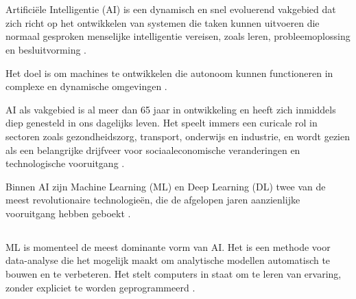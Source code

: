\chapter{}%
\label{ch:stand-van-zaken}



\section{}%
\label{sec:artificiële-intelligentie}

Artificiële Intelligentie (AI) is een dynamisch en snel evoluerend vakgebied dat zich richt op het ontwikkelen van systemen die taken kunnen uitvoeren die normaal gesproken menselijke intelligentie vereisen, zoals leren, probleemoplossing en besluitvorming \autocite{SharifaniEtAl2023}.

Het doel is om machines te ontwikkelen die autonoom kunnen functioneren in complexe en dynamische omgevingen \autocite{Kouassi2023}.

AI als vakgebied is al meer dan 65 jaar in ontwikkeling en heeft zich inmiddels diep genesteld in ons dagelijks leven. Het speelt immers een curicale rol in sectoren zoals gezondheidszorg, transport, onderwijs en industrie, en wordt gezien als een belangrijke drijfveer voor sociaaleconomische veranderingen en technologische vooruitgang \autocite{JiangEtAl2022}.

Binnen AI zijn Machine Learning (ML) en Deep Learning (DL) twee van de meest revolutionaire technologieën, die de afgelopen jaren aanzienlijke vooruitgang hebben geboekt \autocite{SharifaniEtAl2023}.

\section{}%
\label{sec:machine-learning}

ML is momenteel de meest dominante vorm van AI. Het is een methode voor data-analyse die het mogelijk maakt om analytische modellen automatisch te bouwen en te verbeteren. Het stelt computers in staat om te leren van ervaring, zonder expliciet te worden geprogrammeerd \autocite{SharifaniEtAl2023}.

